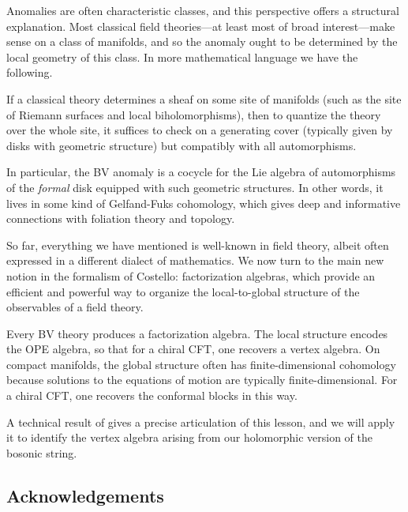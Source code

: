 Anomalies are often characteristic classes, and this perspective offers a structural explanation.
Most classical field theories---at least most of broad interest---make sense on a class of manifolds,
and so the anomaly ought to be determined by the local geometry of this class.
In more mathematical language we have the following.

\begin{lesson}
If a classical theory determines a sheaf on some site of manifolds (such as the site of Riemann surfaces and local biholomorphisms), 
then to quantize the theory over the whole site, 
it suffices to check on a generating cover (typically given by disks with geometric structure) but compatibly with all automorphisms.
\end{lesson}

In particular, the BV anomaly is a cocycle for the Lie algebra of automorphisms of the {\em formal} disk equipped with such geometric structures.
In other words, it lives in some kind of Gelfand-Fuks cohomology, which gives deep and informative connections with foliation theory and topology.

So far, everything we have mentioned is well-known in field theory, 
albeit often expressed in a different dialect of mathematics.
We now turn to the main new notion in the formalism of Costello:
factorization algebras, which provide an efficient and powerful way to organize the local-to-global structure of the observables of a field theory.

\begin{lesson}[\cite{CG1,CG2}]
Every BV theory produces a factorization algebra. 
The local structure encodes the OPE algebra, so that for a chiral CFT, one recovers a vertex algebra. 
On compact manifolds, the global structure often has finite-dimensional cohomology because solutions to the equations of motion are typically finite-dimensional.
For a chiral CFT, one recovers the conformal blocks in this way.
\end{lesson}

A technical result of \cite{CG1} gives a precise articulation of this lesson,
and we will apply it to identify the vertex algebra arising from our holomorphic version of the bosonic string.

\subsection{Acknowledgements}

